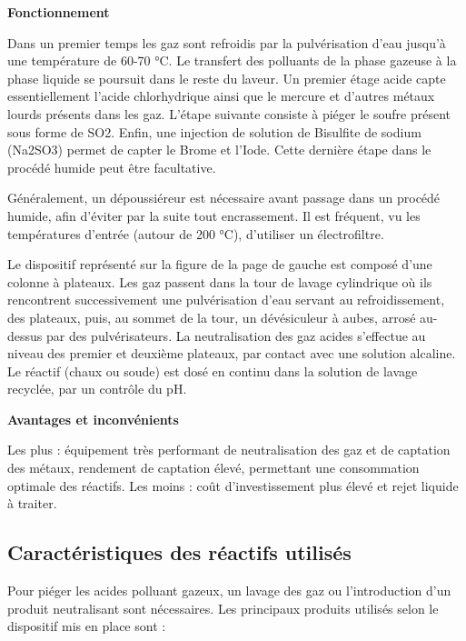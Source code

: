 \vspace{0.3cm}
\textbf{Fonctionnement}
\vspace{0.3cm}

Dans un premier temps les gaz sont refroidis par la pulvérisation d’eau jusqu’à une température de 60-70 °C. Le transfert des polluants de la phase gazeuse à la phase liquide se poursuit dans le reste du laveur. Un premier étage acide capte essentiellement l’acide chlorhydrique ainsi que le mercure et d’autres métaux lourds présents dans les gaz. L’étape suivante consiste à piéger le soufre présent sous forme de SO2. Enfin, une injection de solution de Bisulfite de sodium (Na2SO3) permet de capter le Brome et l’Iode. Cette dernière étape dans le procédé humide peut être facultative.
\vspace{0.3cm}

Généralement, un dépoussiéreur est nécessaire avant passage dans un procédé humide, afin d’éviter par la suite tout encrassement. Il est fréquent, vu les températures d’entrée (autour de 200 °C), d’utiliser un électrofiltre.
\vspace{0.3cm}

Le dispositif représenté sur la figure de la page de gauche est composé d’une colonne à plateaux. Les gaz passent dans la tour de lavage cylindrique où ils rencontrent successivement une pulvérisation d’eau servant au refroidissement, des plateaux, puis, au sommet de la tour, un dévésiculeur à aubes, arrosé au-dessus par des pulvérisateurs. La neutralisation des gaz acides s’effectue au niveau des premier et deuxième plateaux, par contact avec une solution alcaline. Le réactif (chaux ou soude) est dosé en continu dans la solution de lavage recyclée, par un contrôle du pH.



\vspace{0.3cm}
\textbf{Avantages et inconvénients}
\vspace{0.3cm}

Les plus : équipement très performant de neutralisation des gaz et de captation des métaux, rendement de captation élevé, permettant une consommation optimale des réactifs.
Les moins : coût d’investissement plus élevé et rejet liquide à traiter.


\subsection{Caractéristiques des réactifs utilisés} 

Pour piéger les acides polluant gazeux, un lavage des gaz ou l’introduction d’un produit neutralisant sont nécessaires.
Les principaux produits utilisés selon le dispositif mis en place sont :

